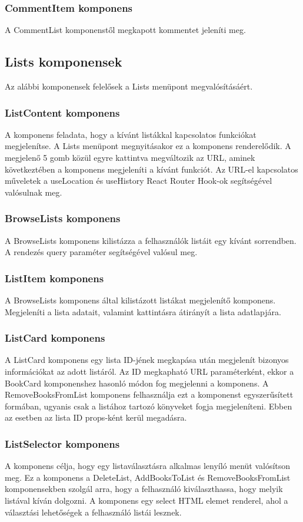\subsubsection{CommentItem komponens}
A CommentList komponenstől megkapott kommentet jeleníti meg.

\subsection{Lists komponensek}
Az alábbi komponensek felelősek a Lists menüpont megvalósításáért.
\subsubsection{ListContent komponens}
A komponens feladata, hogy a kívánt listákkal kapcsolatos funkciókat megjelenítse. A Lists menüpont megnyitásakor ez a komponens renderelődik. A megjelenő 5 gomb közül egyre kattintva megváltozik az URL, aminek következtében a komponens megjeleníti a kívánt funkciót. Az URL-el kapcsolatos műveletek a useLocation és useHistory React Router Hook-ok segítségével valósulnak meg.

\subsubsection{BrowseLists komponens}
A BrowseLists komponens kilistázza a felhasználók listáit egy kívánt sorrendben. A rendezés query paraméter segítségével valósul meg.

\subsubsection{ListItem komponens}
A BrowseLists komponens által kilistázott listákat megjelenítő komponens. Megjeleníti a lista adatait, valamint kattintásra átirányít a lista adatlapjára.

\subsubsection{ListCard komponens}
A ListCard komponens egy lista ID-jének megkapása után megjelenít bizonyos információkat az adott listáról. Az ID  megkapható URL paraméterként, ekkor a BookCard komponenshez hasonló módon fog megjelenni a komponens. A RemoveBooksFromList komponens felhasználja ezt a komponenst egyszerűsített formában, ugyanis csak a listához tartozó könyveket fogja megjeleníteni. Ebben az esetben az lista ID props-ként kerül megadásra.

\subsubsection{ListSelector komponens}
A komponens célja, hogy egy listaválasztásra alkalmas lenyíló menüt valósítson meg. Ez a komponens a DeleteList, AddBooksToList és RemoveBooksFromList komponensekben szolgál arra, hogy a felhasználó kiválaszthassa, hogy melyik listával kíván dolgozni. A komponens egy select HTML elemet renderel, ahol a választási lehetőségek a felhasználó listái lesznek.

